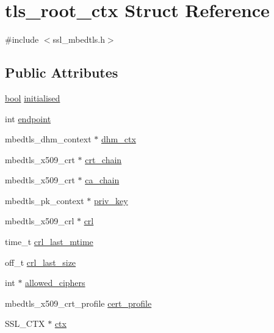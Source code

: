 \hypertarget{structtls__root__ctx}{}\section{tls\+\_\+root\+\_\+ctx Struct Reference}
\label{structtls__root__ctx}


{\ttfamily \#include $<$ssl\+\_\+mbedtls.\+h$>$}

\subsection*{Public Attributes}
\begin{DoxyCompactItemize}
\item 
\hyperlink{automatic_8c_abb452686968e48b67397da5f97445f5b}{bool} \hyperlink{structtls__root__ctx_ab71180f4ac83a6a4d5200d193897a0d7}{initialised}
\item 
int \hyperlink{structtls__root__ctx_ac8ae8de8fc8e6b1aa1d2791480d8da12}{endpoint}
\item 
mbedtls\+\_\+dhm\+\_\+context $\ast$ \hyperlink{structtls__root__ctx_a9aaf4284e2fa54b38e57070057a28a2e}{dhm\+\_\+ctx}
\item 
mbedtls\+\_\+x509\+\_\+crt $\ast$ \hyperlink{structtls__root__ctx_a272ecb7b6152dea69b53317f491fe81d}{crt\+\_\+chain}
\item 
mbedtls\+\_\+x509\+\_\+crt $\ast$ \hyperlink{structtls__root__ctx_a647982cddec0274b16b0376140cff607}{ca\+\_\+chain}
\item 
mbedtls\+\_\+pk\+\_\+context $\ast$ \hyperlink{structtls__root__ctx_af1c33dcb72f792e9aace760b9d10879b}{priv\+\_\+key}
\item 
mbedtls\+\_\+x509\+\_\+crl $\ast$ \hyperlink{structtls__root__ctx_a03ca403f806d7d60d1b8f2d0d56d0e0d}{crl}
\item 
time\+\_\+t \hyperlink{structtls__root__ctx_a9cde6d158aa07a2aee5133676669b725}{crl\+\_\+last\+\_\+mtime}
\item 
off\+\_\+t \hyperlink{structtls__root__ctx_a1df9958887a4449153c563a7e318077d}{crl\+\_\+last\+\_\+size}
\item 
int $\ast$ \hyperlink{structtls__root__ctx_a8561171233831df2b135c5038660284a}{allowed\+\_\+ciphers}
\item 
mbedtls\+\_\+x509\+\_\+crt\+\_\+profile \hyperlink{structtls__root__ctx_ab5662f92486fc6033d30b680f013a42e}{cert\+\_\+profile}
\item 
S\+S\+L\+\_\+\+C\+T\+X $\ast$ \hyperlink{structtls__root__ctx_a800d3fe22d25ed24ae39e51b55cb785d}{ctx}
\end{DoxyCompactItemize}


